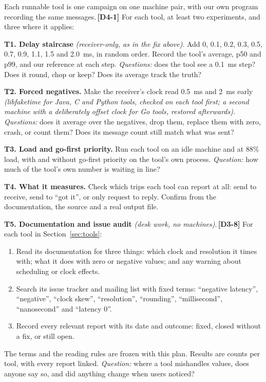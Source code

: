 \documentclass[11pt]{article}
\newcommand{\gl}[1]{{\color{soft}\itshape\small (#1)}}
\newcommand{\chgold}[1]{\,{\color{oldcol}\bfseries\footnotesize[#1]}}
\begin{document}
Each runnable tool is one campaign on one machine pair, with our own program recording the same messages.\chgold{D4-1} For each tool, at least two experiments, and three where it applies:

\textbf{T1. Delay staircase} \gl{receiver-only, as in the fix above}. Add 0, 0.1, 0.2, 0.3, 0.5, 0.7, 0.9, 1.1, 1.5 and 2.0~ms, in random order. Record the tool's average, p50 and p99, and our reference at each step. \emph{Questions:} does the tool see a 0.1~ms step? Does it round, chop or keep? Does its average track the truth?

\textbf{T2. Forced negatives.} Make the receiver's clock read 0.5~ms and 2~ms early \gl{libfaketime for Java, C and Python tools, checked on each tool first; a second machine with a deliberately offset clock for Go tools, restored afterwards}. \emph{Questions:} does it average over the negatives, drop them, replace them with zero, crash, or count them? Does its message count still match what was sent?

\textbf{T3. Load and go-first priority.} Run each tool on an idle machine and at 88\% load, with and without go-first priority on the tool's own process. \emph{Question:} how much of the tool's own number is waiting in line?

\textbf{T4. What it measures.} Check which trips each tool can report at all: send to receive, send to ``got it'', or only request to reply. Confirm from the documentation, the source and a real output file.

\textbf{T5. Documentation and issue audit} \gl{desk work, no machines}.\chgold{D3-8} For each tool in Section~\ref{sec:tools}:
\begin{enumerate}
  \item Read its documentation for three things: which clock and resolution it times with; what it does with zero or negative values; and any warning about scheduling or clock effects.
  \item Search its issue tracker and mailing list with fixed terms: ``negative latency'', ``negative'', ``clock skew'', ``resolution'', ``rounding'', ``millisecond'', ``nanosecond'' and ``latency 0''.
  \item Record every relevant report with its date and outcome: fixed, closed without a fix, or still open.
\end{enumerate}
The terms and the reading rules are frozen with this plan. Results are counts per tool, with every report linked. \emph{Question:} where a tool mishandles values, does anyone say so, and did anything change when users noticed?
\end{document}
